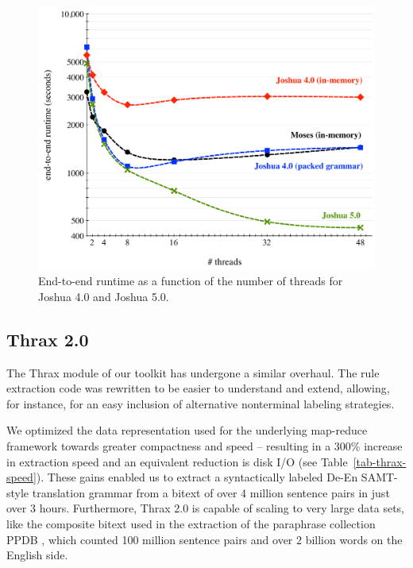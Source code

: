 \documentclass[11pt]{article}
\begin{document}
\begin{figure}[!t]
  \begin{center}
    \includegraphics[width=0.99\linewidth]{figures/comparison.pdf}
  \end{center}
  \label{fig:cmp}
  \caption{End-to-end runtime as a function of the number of threads
    for Joshua 4.0 and Joshua 5.0.}
\end{figure}

\subsection{}

\subsection{Thrax 2.0}

The Thrax module of our toolkit has undergone a similar overhaul. The
rule extraction code was rewritten to be easier to understand and
extend, allowing, for instance, for an easy inclusion of alternative
nonterminal labeling strategies.

We optimized the data representation used for the underlying
map-reduce framework towards greater compactness and speed --
resulting in a 300\% increase in extraction speed and an equivalent
reduction is disk I/O (see Table~\ref{tab-thrax-speed}). These gains
enabled us to extract a syntactically labeled De-En SAMT-style
translation grammar from a bitext of over 4 million sentence pairs in
just over 3 hours. Furthermore, Thrax 2.0 is capable of scaling to
very large data sets, like the composite bitext used in the extraction
of the paraphrase collection PPDB \cite{PPDB}, which counted 100
million sentence pairs and over 2 billion words on the English side.
\end{document}

